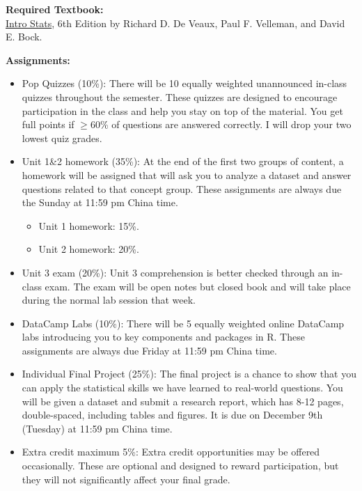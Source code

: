 \documentclass[11pt]{article}
\begin{document}
\vspace{0.5cm}
\large \textbf{Required Textbook:}\\[0.5em]
\href{https://www.pearson.com/en-us/subject-catalog/p/intro-stats/P200000006161/9780137374922?srsltid=AfmBOorburBAh8Z5hPZXmajuzatW53zDClHAQe8Ks9Fk1pQrkGpSkBuC}{Intro Stats}, 6th Edition by Richard D. De Veaux, Paul F. Velleman, and David E. Bock.





\vspace{0.5cm}
\large \textbf{Assignments:}
\begin{itemize}
    \item Pop Quizzes (10\%): There will be 10 equally weighted unannounced in-class quizzes throughout the semester. These quizzes are designed to encourage participation in the class and help you stay on top of the material. You get full points if $\geq$60\% of questions are answered correctly. I will drop your two lowest quiz grades.
    \item Unit 1\&2 homework (35\%): At the end of the first two groups of content, a homework will be assigned that
    will ask you to analyze a dataset and answer questions related to that concept group. These assignments are always due the Sunday at 11:59 pm China time. 
    \begin{itemize}
        \item Unit 1 homework: 15\%.
        \item Unit 2 homework: 20\%.
    \end{itemize}
    \item Unit 3 exam (20\%): Unit 3 comprehension is better checked through an in-class exam. The exam will be open notes but closed book and will take place during the normal lab session that week.
    \item DataCamp Labs (10\%): There will be 5 equally weighted online DataCamp labs introducing you to key components and packages in R. These assignments are always due Friday at 11:59 pm China time. 
    \item Individual Final Project (25\%): The final project is a chance to show that you can apply the statistical skills we have learned to real-world questions. You will be given a dataset and submit a research report, which has 8-12 pages, double-spaced, including tables and figures. It is due on December 9th (Tuesday) at 11:59 pm China time. 
    \item Extra credit maximum 5\%: Extra credit opportunities may be offered occasionally. These are optional and designed to reward participation, but they will not significantly affect your final grade.
\end{itemize}
\end{document}
